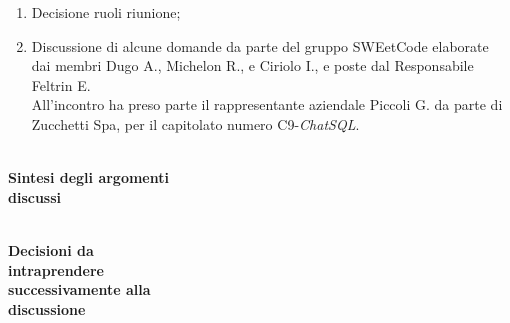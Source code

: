 \documentclass{article}
\begin{document}
\begin{paracol}{2}
\vspace{26.3em}

\begin{enumerate} 
    \item Decisione ruoli riunione;
    \item Discussione di alcune domande da parte del gruppo SWEetCode elaborate dai membri Dugo A., Michelon R., e Ciriolo I., e poste dal Responsabile Feltrin E. \\ All’incontro ha preso parte il rappresentante aziendale Piccoli G. da parte di Zucchetti Spa, per il capitolato numero C9-\textit{ChatSQL}.
\end{enumerate}

\newpage

\switchcolumn
\newpage

\\
\textbf{Sintesi degli argomenti\\discussi\\}


\vspace{40cm}

\\
\textbf{Decisioni da \\intraprendere\\ successivamente alla \\discussione}


\end{paracol}
\end{document}
